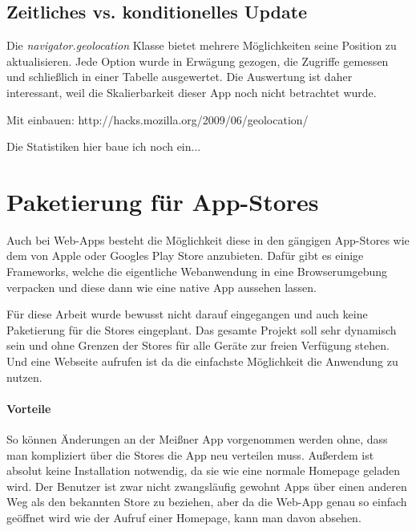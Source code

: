 \subsection{Zeitliches vs. konditionelles Update}
Die \emph{navigator.geolocation} Klasse bietet mehrere Möglichkeiten seine Position zu aktualisieren. Jede Option wurde in Erwägung gezogen, die Zugriffe gemessen und schließlich in einer Tabelle ausgewertet. Die Auswertung ist daher interessant, weil die Skalierbarkeit dieser App noch nicht betrachtet wurde.\par

Mit einbauen: http://hacks.mozilla.org/2009/06/geolocation/\par

Die Statistiken hier baue ich noch ein...


\section{Paketierung für App-Stores}
Auch bei Web-Apps besteht die Möglichkeit diese in den gängigen App-Stores wie dem von Apple oder Googles Play Store anzubieten. Dafür gibt es einige Frameworks, welche die eigentliche Webanwendung in eine Browserumgebung verpacken und diese dann wie eine native App aussehen lassen.\par
Für diese Arbeit wurde bewusst nicht darauf eingegangen und auch keine Paketierung für die Stores eingeplant. Das gesamte Projekt soll sehr dynamisch sein und ohne Grenzen der Stores für alle Geräte zur freien Verfügung stehen. Und eine Webseite aufrufen ist da die einfachste Möglichkeit die Anwendung zu nutzen.

\paragraph{Vorteile}
So können Änderungen an der Meißner App vorgenommen werden ohne, dass man kompliziert über die Stores die App neu verteilen muss. Außerdem ist absolut keine Installation notwendig, da sie wie eine normale Homepage geladen wird. Der Benutzer ist zwar nicht zwangsläufig gewohnt Apps über einen anderen Weg als den bekannten Store zu beziehen, aber da die Web-App genau so einfach geöffnet wird wie der Aufruf einer Homepage, kann man davon absehen.

